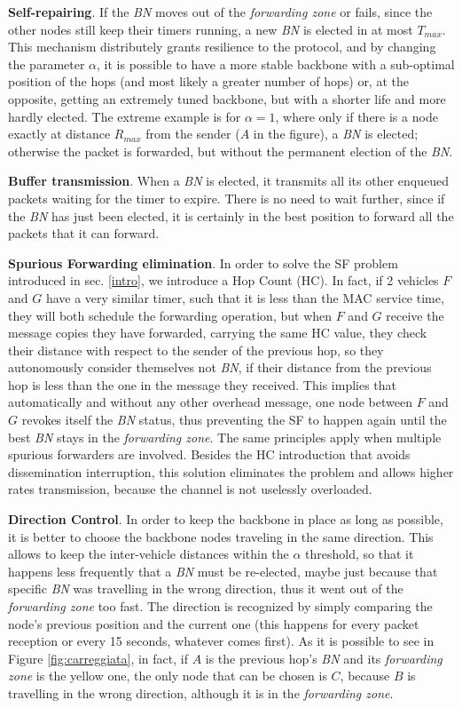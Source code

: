 \documentclass{sig-alternate-2013}
\begin{document}
\textbf{Self-repairing}. If the \textit{BN} moves out of the \textit{forwarding zone} or fails, since the other nodes still keep their timers running, a new \textit{BN} is elected in at most $T_{max}$. This mechanism distributely grants resilience to the protocol, and by changing the parameter $\alpha$, it is possible to have a more stable backbone with a sub-optimal position of the hops (and most likely a greater number of hops) or, at the opposite, getting an extremely tuned backbone, but with a shorter life and more hardly elected. The extreme example is for $\alpha=1$, where only if there is a node exactly at distance $R_{max}$ from the sender ($A$ in the figure), a \textit{BN} is elected; otherwise the packet is forwarded, but without the permanent election of the \textit{BN}.

\textbf{Buffer transmission}. When a \textit{BN} is elected, it transmits all its other enqueued packets waiting for the timer to expire. There is no need to wait further, since if the \textit{BN} has just been elected, it is certainly in the best position to forward all the packets that it can forward.

\textbf{Spurious Forwarding elimination}. In order to solve the SF problem introduced in sec. \ref{intro}, we introduce a Hop Count (HC). In fact, if 2 vehicles $F$ and $G$ have a very similar timer, such that it is less than the MAC service time, they will both schedule the forwarding operation, but when $F$ and $G$ receive the message copies they have forwarded, carrying the same HC value, they check their distance with respect to the sender of the previous hop, so they autonomously consider themselves not \textit{BN}, if their distance from the previous hop is less than the one in the message they received. This implies that automatically and without any other overhead message, one node between $F$ and $G$ revokes itself the \textit{BN} status, thus preventing the SF to happen again until the best \textit{BN} stays in the \textit{forwarding zone}.
The same principles apply when multiple spurious forwarders are involved. Besides the HC introduction that avoids dissemination interruption, this solution eliminates the problem and allows higher rates transmission, because the channel is not uselessly overloaded.

\textbf{Direction Control}. In order to keep the backbone in place as long as possible, it is better to choose the backbone nodes traveling in the same direction. This allows to keep the inter-vehicle distances within the $\alpha$ threshold, so that it happens less frequently that a \textit{BN} must be re-elected, maybe just because that specific \textit{BN} was travelling in the wrong direction, thus it went out of the \textit{forwarding zone} too fast. The direction is recognized by simply comparing the node's previous position and the current one (this happens for every packet reception or every 15 seconds, whatever comes first). As it is possible to see in Figure \ref{fig:carreggiata}, in fact, if $A$ is the previous hop's \textit{BN} and its \textit{forwarding zone} is the yellow one, the only node that can be chosen is $C$, because $B$ is travelling in the wrong direction, although it is in the \textit{forwarding zone}.
\end{document}
